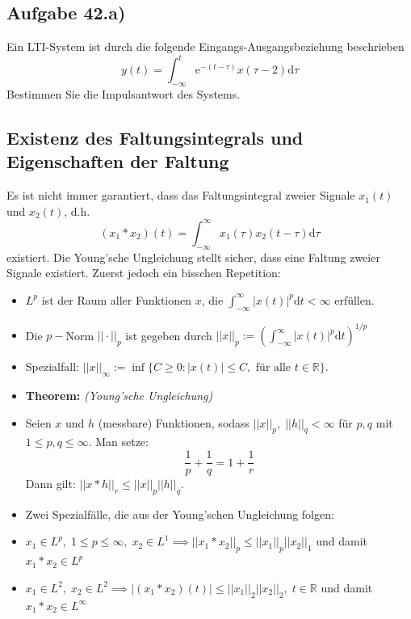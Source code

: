 \documentclass[11pt]{article}
\begin{document}
\subsection*{Aufgabe 42.a)}
\vspace*{-0.5cm}
Ein LTI-System ist durch die folgende Eingangs-Ausgangsbeziehung beschrieben
$$y(t) = \int_{-\infty}^t \text{e}^{-(t-\tau)}x(\tau-2)\text{d}\tau$$
Bestimmen Sie die Impulsantwort des Systems.


\pagebreak

\subsection*{Existenz des Faltungsintegrals und Eigenschaften der Faltung}
\vspace*{-0.5cm}
Es ist nicht immer garantiert, dass das Faltungsintegral zweier Signale $x_1(t)$ und $x_2(t)$, d.h. $$(x_1 \ast x_2)(t) = \int_{-\infty}^{\infty} x_1(\tau)x_2(t-\tau) \text{d}\tau$$ existiert. Die Young'sche Ungleichung stellt sicher, dass eine Faltung zweier Signale existiert. Zuerst jedoch ein bisschen Repetition:
\vspace*{-0.5cm}
\begin{itemize}[leftmargin = 0pt]
     \item[] $L^p$ ist der Raum aller Funktionen $x$, die $\displaystyle\int_{-\infty}^{\infty} |x(t)|^p \text{d}t < \infty$ erfüllen.
     \item[] Die $p-$Norm $||\cdot||_p$ ist gegeben durch $||x||_p := \left(\displaystyle\int_{-\infty}^{\infty} |x(t)|^p \text{d}t\right)^{1/p}$
     \item[] Spezialfall: $||x||_{\infty} := \inf\{C \geq 0: |x(t)| \leq C, \text{ für alle } t\in \mathbb{R}\}$.
     \item[] \textbf{Theorem:} \textit{(Young'sche Ungleichung)} 
     \item[] Seien $x$ und $h$ (messbare) Funktionen, sodass $||x||_p, \; ||h||_q < \infty$ für $p,q$ mit $1 \leq p,q \leq \infty$. Man setze:\\
     $$\frac{1}{p} + \frac{1}{q} = 1 + \frac{1}{r}$$
     Dann gilt: $||x \ast h||_r \leq ||x||_p||h||_q$.
     \item[] Zwei Spezialfälle, die aus der Young'schen Ungleichung folgen:
     \item[] $x_1 \in L^p, \; 1 \leq p \leq \infty, \; x_2 \in L^1 \implies ||x_1 \ast x_2 ||_p \leq ||x_1||_p ||x_2||_1$ und damit $x_1 \ast x_2 \in L^p$
     \item[] $x_1 \in L^2, \; x_2 \in L^2 \implies |(x_1 \ast x_2 )(t)| \leq ||x_1||_2 ||x_2||_2, \; t \in \mathbb{R}$ und damit $x_1 \ast x_2 \in L^\infty$
\end{itemize}
\end{document}
